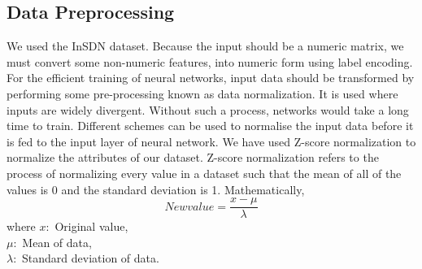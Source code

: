 \subsection{Data Preprocessing}
\vspace{-18pt}
We used the InSDN dataset. Because the input should be a numeric matrix, we must convert some non-numeric features, into numeric form using label encoding. For the efficient training of neural networks, input data should be transformed by performing some pre-processing known as data normalization. It is used where inputs are widely divergent. Without such a process, networks would take a long time to train. Different schemes can be used to normalise the input data before it is fed to the input layer of neural network. We have used Z-score normalization to normalize the attributes of our dataset. Z-score normalization refers to the process of normalizing every value in a dataset such that the mean of all of the values is 0 and the standard deviation is 1. Mathematically,
\begin{equation}
New value = \frac{x- \mu}{\lambda}
\end{equation}
where $x: $ Original value,\\ $\mu: $ Mean of data,\\ $\lambda: $ Standard deviation of data.
